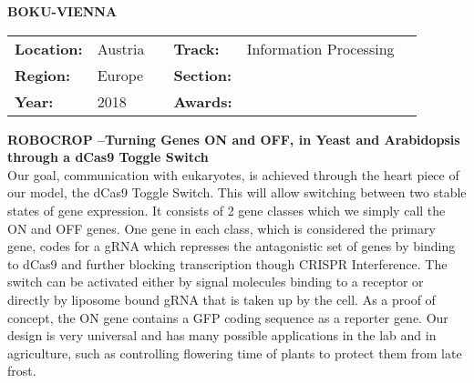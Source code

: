 \textbf{\uppercase{BOKU-Vienna}}
\FloatBarrier
\begin{table}[h]
\begin{tabular}{lp{2.5cm}llll}
\textbf{Location:} & Austria & \multicolumn{1}{|l}{} & \textbf{Track:}   & Information Processing \\
\textbf{Region:}   & Europe   & \multicolumn{1}{|l}{} & \textbf{Section:} &  \\
\textbf{Year:}     & 2018   & \multicolumn{1}{|l}{} & \textbf{Awards:}  &
\end{tabular}
\end{table}
\FloatBarrier
\noindent	\textbf{ROBOCROP –Turning Genes ON and OFF, in Yeast and Arabidopsis through a dCas9 Toggle Switch} \vspace{.2cm}\\
Our goal, communication with eukaryotes, is achieved through the heart piece of our model, the dCas9 Toggle Switch.
This will allow switching between two stable states of gene expression. It consists of 2 gene classes which we simply call the ON and OFF genes.
One gene in each class, which is considered the primary gene, codes for a gRNA which represses the antagonistic set of genes by binding to dCas9 and further blocking transcription though CRISPR Interference.
The switch can be activated either by signal molecules binding to a receptor or directly by liposome bound gRNA that is taken up by the cell.
As a proof of concept, the ON gene contains a GFP coding sequence as a reporter gene.
Our design is very universal and has many possible applications in the lab and in agriculture, such as controlling flowering time of plants to protect them from late frost.
\vspace{2cm}

